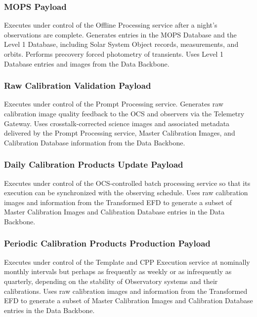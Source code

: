 \documentclass[DM,lsstdraft,toc]{lsstdoc}
\begin{document}
\subsubsection{MOPS Payload}\label{mops-payload}

Executes under control of the Offline Processing service after a night's
observations are complete. Generates entries in the MOPS Database and
the Level 1 Database, including Solar System Object records,
measurements, and orbits. Performs precovery forced photometry of
transients. Uses Level 1 Database entries and images from the Data
Backbone.

\subsubsection{Raw Calibration Validation
Payload}\label{raw-calibration-validation-payload}

Executes under control of the Prompt Processing service. Generates raw
calibration image quality feedback to the OCS and observers via the
Telemetry Gateway. Uses crosstalk-corrected science images and
associated metadata delivered by the Prompt Processing service, Master
Calibration Images, and Calibration Database information from the Data
Backbone.

\subsubsection{Daily Calibration Products Update
Payload}\label{daily-calibration-products-update-payload}

Executes under control of the OCS-controlled batch processing service so
that its execution can be synchronized with the observing schedule. Uses
raw calibration images and information from the Transformed EFD to
generate a subset of Master Calibration Images and Calibration Database
entries in the Data Backbone.

\subsubsection{Periodic Calibration Products Production
Payload}\label{periodic-calibration-products-production-payload}

Executes under control of the Template and CPP Execution service at
nominally monthly intervals but perhaps as frequently as weekly or as
infrequently as quarterly, depending on the stability of Observatory
systems and their calibrations. Uses raw calibration images and
information from the Transformed EFD to generate a subset of Master
Calibration Images and Calibration Database entries in the Data
Backbone.
\end{document}
